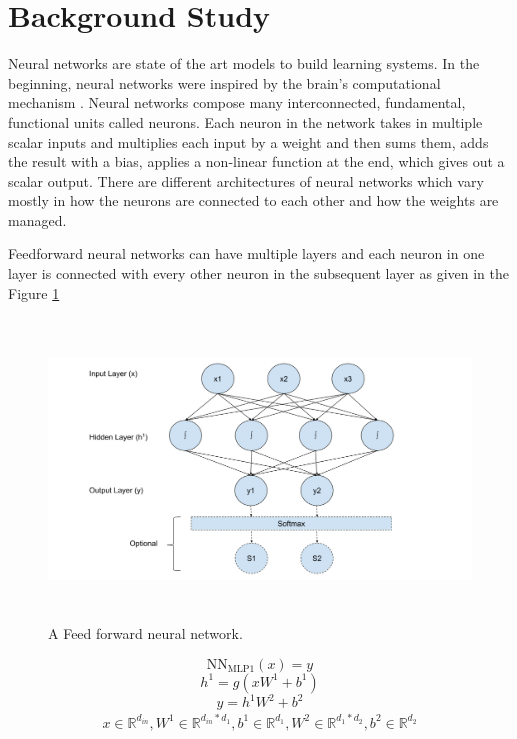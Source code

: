 \documentclass[a4paper, 11pt]{article}
\newcommand{\R}{\mathbb{R}}
\begin{document}
\section{Background Study}

Neural networks are state of the art models to build learning systems. In the beginning, neural networks were inspired by the brain's computational mechanism \cite{McCulloch1943}. Neural networks compose many interconnected, fundamental, functional units called neurons. Each neuron in the network takes in multiple scalar inputs and multiplies each input by a weight and then sums them, adds the result with a bias, applies a non-linear function at the end, which gives out a scalar output. There are different architectures of neural networks which vary mostly in how the neurons are connected to each other and how the weights are managed. 

Feedforward neural networks \cite{Svozil1997} can have multiple layers and each neuron in one layer is connected with every other neuron in the subsequent layer as given in the Figure \ref{fig:Feed forward neural network}

\begin{figure}[htpb]
    \centering
    \includegraphics[width=\textwidth,height=8cm,keepaspectratio=true]
    {feed-forward-neural-network.png}
    \caption{
        A Feed forward neural network.
    }
    \label{fig:Feed forward neural network}
\end{figure}

\begin{equation}
\mathrm{NN_{MLP1}}(x) = y
\end{equation}
\begin{equation} \label{equ: feed forward hidden layer}
h^1 = g(xW^1 + b^1)
\end{equation}
\begin{equation} \label{equ: feed forward output layer}
y = h^1W^2 + b^2
\end{equation}
\begin{align*}
x \in \R^{d_{in}}, W^1 \in \R^{d_{in}*d_1}, b^1 \in \R^{d_1}, W^2 \in \R^{d_1*d_2}, b^2 \in \R^{d_2}
\end{align*}
\end{document}
